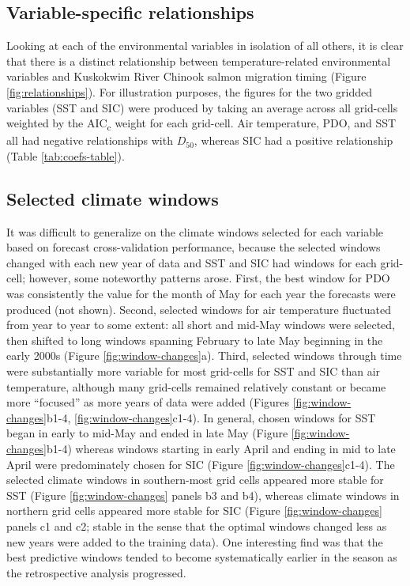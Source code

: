 \documentclass[12pt,]{book}
\theoremstyle{definition}
\theoremstyle{definition}
\theoremstyle{definition}
\theoremstyle{remark}
\begin{document}
\subsection{Variable-specific
relationships}\label{variable-specific-relationships}

\noindent
Looking at each of the environmental variables in isolation of all
others, it is clear that there is a distinct relationship between
temperature-related environmental variables and Kuskokwim River Chinook
salmon migration timing (Figure \ref{fig:relationships}). For
illustration purposes, the figures for the two gridded variables (SST
and SIC) were produced by taking an average across all grid-cells
weighted by the AIC\textsubscript{c} weight for each grid-cell. Air
temperature, PDO, and SST all had negative relationships with
\(D_{50}\), whereas SIC had a positive relationship (Table
\ref{tab:coefs-table}).

\subsection{Selected climate windows}\label{selected-climate-windows}

\noindent
It was difficult to generalize on the climate windows selected for each
variable based on forecast cross-validation performance, because the
selected windows changed with each new year of data and SST and SIC had
windows for each grid-cell; however, some noteworthy patterns arose.
First, the best window for PDO was consistently the value for the month
of May for each year the forecasts were produced (not shown). Second,
selected windows for air temperature fluctuated from year to year to
some extent: all short and mid-May windows were selected, then shifted
to long windows spanning February to late May beginning in the early
2000s (Figure \ref{fig:window-changes}a). Third, selected windows
through time were substantially more variable for most grid-cells for
SST and SIC than air temperature, although many grid-cells remained
relatively constant or became more ``focused'' as more years of data
were added (Figures \ref{fig:window-changes}b1-4,
\ref{fig:window-changes}c1-4). In general, chosen windows for SST began
in early to mid-May and ended in late May (Figure
\ref{fig:window-changes}b1-4) whereas windows starting in early April
and ending in mid to late April were predominately chosen for SIC
(Figure \ref{fig:window-changes}c1-4). The selected climate windows in
southern-most grid cells appeared more stable for SST (Figure
\ref{fig:window-changes} panels b3 and b4), whereas climate windows in
northern grid cells appeared more stable for SIC (Figure
\ref{fig:window-changes} panels c1 and c2; stable in the sense that the
optimal windows changed less as new years were added to the training
data). One interesting find was that the best predictive windows tended
to become systematically earlier in the season as the retrospective
analysis progressed.
\end{document}
